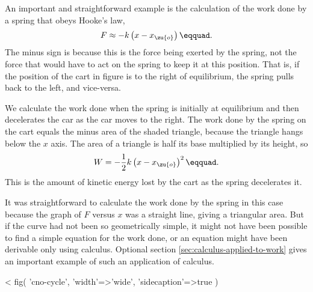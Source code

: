 An important and straightforward example is the calculation
of the work done by a spring that obeys Hooke's law,
\begin{equation*}
 F \approx -k\left(x-x_\zu{o}\right)\eqquad.
\end{equation*}
The minus sign is because this is the force being exerted by
the spring, not the force that would have to act on the
spring to keep it at this position. That is, if the position
of the cart in figure 
is to the right of equilibrium, the spring pulls
back to the left, and vice-versa.

We calculate the work done when the spring is initially at
equilibrium and then decelerates the car as the car moves to
the right. The work done by the spring on the cart equals
the minus area of the shaded triangle, because the triangle
hangs below the $x$ axis. The area of a triangle is half its
base multiplied by its height, so
\begin{equation*}
  W = -\frac{1}{2}k\left(x-x_\zu{o}\right)^2\eqquad.
\end{equation*}
This is the amount of kinetic energy lost by the cart as the
spring decelerates it.

It was straightforward to calculate the work done by the
spring in this case because the graph of $F$ versus $x$ was
a straight line, giving a triangular area. But if the curve
had not been so geometrically simple, it might not have been
possible to find a simple equation for the work done, or an
equation might have been derivable only using calculus.
Optional section \ref{sec:calculus-applied-to-work} gives an important example of such an
application of calculus.


<%
  fig(
    'cno-cycle',
    {
      'width'=>'wide',
      'sidecaption'=>true
    }
  )

